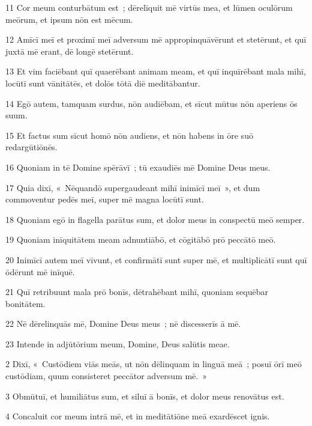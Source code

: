 \psalmVerse
  {\phantom{0}11}
  {Cor meum conturbātum est~; dērelīquit mē virtūs mea, et lūmen oculōrum meōrum, et ipsum nōn est mēcum.}


\psalmVerse
  {\phantom{0}12}
  {Amīcī meī et proximī meī adversum mē appropinquāvērunt et stetērunt, et quī juxtā mē erant, dē longē stetērunt.}


\psalmVerse
  {\phantom{0}13}
  {Et vim faciēbant quī quaerēbant animam meam, et quī inquīrēbant mala mihī, locūtī sunt vānitātēs, et dolōs tōtā diē meditābantur.}


\psalmVerse
  {\phantom{0}14}
  {Egō autem, tamquam surdus, nōn audiēbam, et sīcut mūtus nōn aperiens ōs suum.}


\psalmVerse
  {\phantom{0}15}
  {Et factus sum sīcut homō nōn audiens, et nōn habens in ōre suō redargūtiōnēs.}


\psalmVerse
  {\phantom{0}16}
  {Quoniam in tē Domine spērāvī~; tū exaudiēs mē Domine Deus meus.}


\psalmVerse
  {\phantom{0}17}
  {Quia dixī, «~Nēquandō supergaudeant mihī inimīcī meī~», et dum commoventur pedēs meī, super mē magna locūtī sunt.}


\psalmVerse
  {\phantom{0}18}
  {Quoniam egō in flagella parātus sum, et dolor meus in conspectū meō semper.}


\psalmVerse
  {\phantom{0}19}
  {Quoniam inīquitātem meam adnuntiābō, et cōgitābō prō peccātō meō.}


\psalmVerse
  {\phantom{0}20}
  {Inimīcī autem meī vīvunt, et confirmātī sunt super mē, et multiplicātī sunt quī ōdērunt mē inīquē.}


\psalmVerse
  {\phantom{0}21}
  {Quī retribuunt mala prō bonīs, dētrahēbant mihī, quoniam sequēbar bonitātem.}


\psalmVerse
  {\phantom{0}22}
  {Nē dērelinquās mē, Domine Deus meus~; nē discesserīs ā mē.}


\psalmVerse
  {\phantom{0}23}
  {Intende in adjūtōrium meum, Domine, Deus salūtis meae.}



\psalmVerse
  {\phantom{00}2}
  {Dixī, «~Custōdiem viās meās, ut nōn dēlinquam in linguā meā~; posuī ōrī meō custōdiam, quum consisteret peccātor adversum mē.~»}


\psalmVerse
  {\phantom{00}3}
  {Obmūtuī, et humiliātus sum, et siluī ā bonīs, et dolor meus renovātus est.}


\psalmVerse
  {\phantom{00}4}
  {Concaluit cor meum intrā mē, et in meditātiōne meā exardēscet ignis.}


